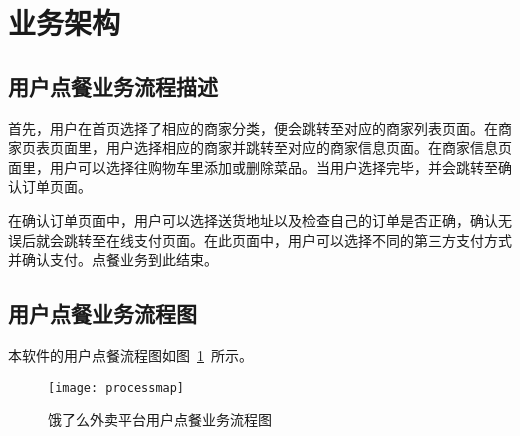 \section{业务架构}
\subsection{用户点餐业务流程描述}
首先，用户在首页选择了相应的商家分类，便会跳转至对应的商家列表页面。在商家页表页面里，用户选择相应的商家并跳转至对应的商家信息页面。在商家信息页面里，用户可以选择往购物车里添加或删除菜品。当用户选择完毕，并会跳转至确认订单页面。

在确认订单页面中，用户可以选择送货地址以及检查自己的订单是否正确，确认无误后就会跳转至在线支付页面。在此页面中，用户可以选择不同的第三方支付方式并确认支付。点餐业务到此结束。
\subsection{用户点餐业务流程图}
本软件的用户点餐流程图如图~\ref{fig:process}~所示。
\begin{figure}[htbp]
    \centering
    \texttt{[image: processmap]}
    \caption{饿了么外卖平台用户点餐业务流程图}\label{fig:process}
    \vspace{\baselineskip}
\end{figure}

